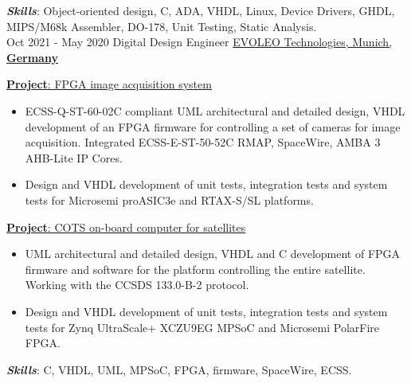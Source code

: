 \documentclass[letterpaper]{twentysecondcv} %
\begin{document}
\begin{twenty}
{            \vspace{2 mm}
            \textbf{\textit{Skills}}: Object-oriented design, C, ADA, VHDL, Linux, Device Drivers, GHDL, MIPS/M68k Assembler, DO-178, Unit Testing, Static Analysis.
        }\\
    \twentyitem
        {Oct 2021 -}
    	{May 2020}
        {Digital Design Engineer}
        {\href{http://evoleotech.com/company/}{EVOLEO Technologies, Munich, \textbf{Germany}}}
        {}
        {
            \vspace{2 mm}
            \underline{\textbf{Project}: FPGA image acquisition system}

            \vspace{2 mm}
            \begin{itemize}
                \item ECSS-Q-ST-60-02C compliant UML architectural and detailed design, VHDL development of an FPGA firmware for controlling a set of cameras for image acquisition. Integrated ECSS-E-ST-50-52C RMAP, SpaceWire, AMBA 3 AHB-Lite IP Cores.
                \item Design and VHDL development of unit tests, integration tests and system tests for Microsemi proASIC3e and RTAX-S/SL platforms.
            \end{itemize}

            \vspace{2 mm}
            \underline{\textbf{Project}: COTS on-board computer for satellites}

            \vspace{2 mm}
            \begin{itemize}
                \item UML architectural and detailed design, VHDL and C development of FPGA firmware and software for the platform controlling the entire satellite. Working with the CCSDS 133.0-B-2 protocol.
                \item Design and VHDL development of unit tests, integration tests and system tests for Zynq UltraScale+ XCZU9EG MPSoC and Microsemi PolarFire FPGA.
            \end{itemize}

            \vspace{2 mm}
            \textbf{\textit{Skills}}: C, VHDL, UML, MPSoC, FPGA, firmware, SpaceWire, ECSS.
        }
\end{twenty}

\newpage
\makeextrainfo %
\end{document}
